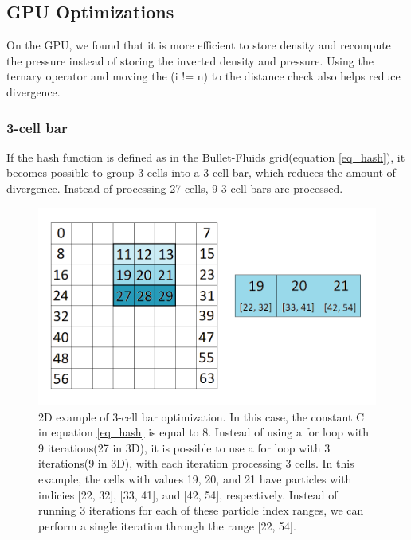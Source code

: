 \documentclass[]{article}
\begin{document}
	\subsection{GPU Optimizations}
		On the GPU, we found that it is more efficient to store density and recompute the pressure instead of storing 
		the inverted density and pressure. Using the ternary operator and moving the (i != n) to the distance check also 
		helps reduce divergence.\\
		
		\subsubsection{3-cell bar}
			If the hash function is defined as in the Bullet-Fluids grid(equation \ref{eq_hash}), it becomes possible
			to group 3 cells into a 3-cell bar, which reduces the amount of divergence. Instead of processing
			27 cells, 9 3-cell bars are processed.
			
			\begin{figure}[ht]
			  \centering
				\includegraphics[width=6.0in]{images/3CellBar}
				\caption{2D example of 3-cell bar optimization. In this case, the constant C in equation \ref{eq_hash} is 
				equal to 8. Instead of using a for loop with 9 iterations(27 in 3D), it is possible to use a for loop with 3
				iterations(9 in 3D), with each iteration processing 3 cells. In this example, the cells with values 19, 20, 
				and 21 have particles with indicies [22, 32], [33, 41], and [42, 54], respectively. Instead of running 3 
				iterations for each of these particle index ranges, we can perform a single iteration through the range [22, 54].}
			\end{figure}
		
\end{document}
